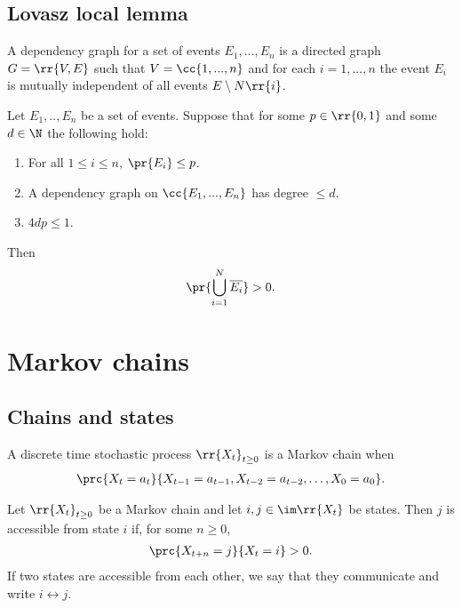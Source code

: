 \documentclass{article}
\begin{document}
\subsection{Lovasz local lemma}

\begin{definition}
  A dependency graph for a set of events $E_1,...,E_n$ is a directed graph $G=\rr{V,E}$
  such that $V=\cc{1,...,n}$ and for each $i=1,...,n$ the event $E_i$ is mutually
  independent of all events $E\setminus N\rr{i}$.
\end{definition}

\begin{theorem}
  Let $E_1,..,E_n$ be a set of events. Suppose that for some $p\in \rr{0,1}$ and some
  $d\in\N$ the following hold:
  \begin{enumerate}
    \item For all $1\leq i\leq n$, $\pr{E_i}\leq p$.
    \item A dependency graph on $\cc{E_1,...,E_n}$ has degree $\leq d$.
    \item $4dp\leq 1$.
  \end{enumerate}
  Then
  \begin{align*}
    \pr{\bigcup_{i=1}^N \overline{E_i}} > 0.
  \end{align*}
\end{theorem}

\section{Markov chains}

\subsection{Chains and states}

\begin{definition}
  A discrete time stochastic process $\rr{X_t}_{t\geq 0}$ is a Markov chain when
  \begin{align*}
    \prc{X_t=a_t}{X_{t-1}=a_{t-1},X_{t-2}=a_{t-2},\ldots,X_0=a_0}.
  \end{align*}
\end{definition}

\begin{definition}
  Let $\rr{X_t}_{t\geq 0}$ be a Markov chain and let $i,j\in\im\rr{X_t}$ be states.
  Then $j$ is accessible from state $i$ if, for some $n\geq 0$,
  \begin{align*}
    \prc{X_{t+n}=j}{X_t=i} > 0.
  \end{align*}
  If two states are accessible from each other, we say that they communicate and write
  $i\leftrightarrow j$.
\end{definition}
\end{document}
